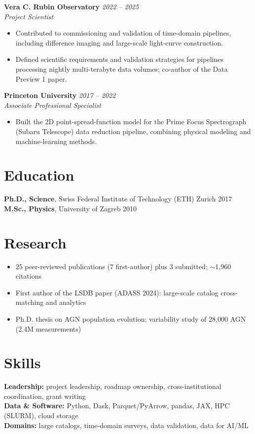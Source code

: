 \documentclass[11pt,letterpaper]{article}
\begin{document}
\textbf{Vera C. Rubin Observatory} \hfill \textit{2022 -- 2025} \\
\textit{Project Scientist}

\begin{itemize}
  \item Contributed to commissioning and validation of time-domain pipelines,
        including difference imaging and large-scale light-curve construction.
  \item Defined scientific requirements and validation strategies for pipelines
        processing nightly multi-terabyte data volumes; co-author of the Data Preview 1 paper.
\end{itemize}

\textbf{Princeton University} \hfill \textit{2017 -- 2022} \\
\textit{Associate Professional Specialist}

\begin{itemize}
  \item Built the 2D point-spread-function model for the Prime Focus Spectrograph (Subaru Telescope)
        data reduction pipeline, combining physical modeling and machine-learning methods.
\end{itemize}

\section*{Education}

\textbf{Ph.D., Science}, Swiss Federal Institute of Technology (ETH) Zurich \hfill 2017 \\
\textbf{M.Sc., Physics}, University of Zagreb \hfill 2010

\section*{Research}

\begin{itemize}
  \item 25 peer-reviewed publications (7 first-author) plus 3 submitted; $\sim$1{,}960 citations
  \item First author of the LSDB paper (ADASS 2024): large-scale catalog cross-matching and analytics
  \item Ph.D. thesis on AGN population evolution; variability study of 28{,}000 AGN (2.4M measurements)
\end{itemize}

\section*{Skills}

\textbf{Leadership:} project leadership, roadmap ownership, cross-institutional coordination, grant writing \\
\textbf{Data \& Software:} Python, Dask, Parquet/PyArrow, pandas, JAX, HPC (SLURM), cloud storage \\
\textbf{Domains:} large catalogs, time-domain surveys, data validation, data for AI/ML
\end{document}
